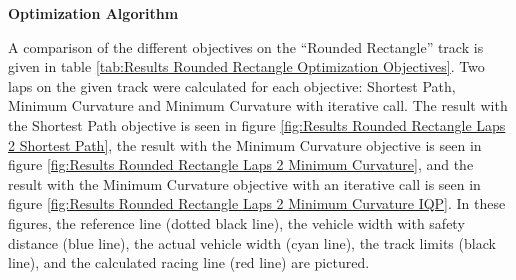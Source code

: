 \textbf{Optimization Algorithm}

A comparison of the different objectives on the ``Rounded Rectangle'' track is given in table \ref{tab:Results Rounded Rectangle Optimization Objectives}. Two laps on the given track were calculated for each objective: Shortest Path, Minimum Curvature and Minimum Curvature with iterative call. The result with the Shortest Path objective is seen in figure \ref{fig:Results Rounded Rectangle Laps 2 Shortest Path}, the result with the Minimum Curvature objective is seen in figure \ref{fig:Results Rounded Rectangle Laps 2 Minimum Curvature}, and the result with the Minimum Curvature objective with an iterative call is seen in figure \ref{fig:Results Rounded Rectangle Laps 2 Minimum Curvature IQP}. In these figures, the reference line (dotted black line), the vehicle width with safety distance (blue line), the actual vehicle width (cyan line), the track limits (black line), and the calculated racing line (red line) are pictured.

